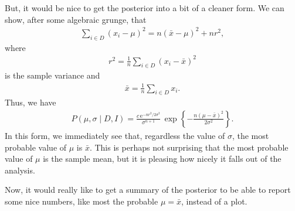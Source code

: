 But, it would be nice to get the posterior into a bit of a cleaner
form.  We can show, after some algebraic grunge, that
\begin{align}
\sum_{i\in D}(x_i - \mu)^2 = n(\bar{x} - \mu)^2 + nr^2,
\end{align}
where
\begin{align}
r^2 = \frac{1}{n}\sum_{i\in D}(x_i - \bar{x})^2
\end{align}
is the sample variance and
\begin{align}
\bar{x} = \frac{1}{n}\sum_{i\in D}x_i.
\end{align}
Thus, we have
\begin{align}
P(\mu, \sigma \mid D, I) = \frac{c\,\mathrm{e}^{-nr^2/2\sigma^2}}{\sigma^{n+1}}\,
\exp\left\{-\frac{n(\mu - \bar{x})^2}{2\sigma^2}\right\}.
\end{align}
In this form, we immediately see that, regardless the value of
$\sigma$, the most probable value of $\mu$ is $\bar{x}$.  This is
perhaps not surprising that the most probable value of $\mu$ is the
sample mean, but it is pleasing how nicely it falls out of the
analysis.

Now, it would really like to get a summary of the posterior to be able
to report some nice numbers, like most the probable $\mu = \bar{x}$,
instead of a plot.


